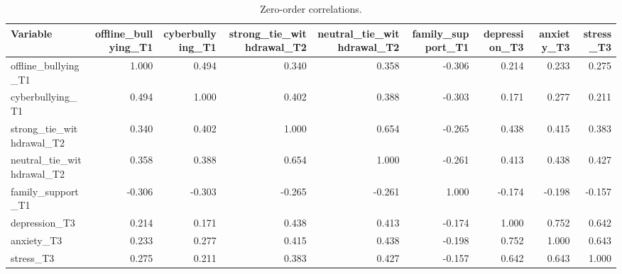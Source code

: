 \begin{table}
\caption{Zero-order correlations.}
\label{tab:corr}
\begin{tabular}{lrrrrrrrr}
\toprule
Variable & offline_bullying_T1 & cyberbullying_T1 & strong_tie_withdrawal_T2 & neutral_tie_withdrawal_T2 & family_support_T1 & depression_T3 & anxiety_T3 & stress_T3 \\
\midrule
offline_bullying_T1 & 1.000 & 0.494 & 0.340 & 0.358 & -0.306 & 0.214 & 0.233 & 0.275 \\
cyberbullying_T1 & 0.494 & 1.000 & 0.402 & 0.388 & -0.303 & 0.171 & 0.277 & 0.211 \\
strong_tie_withdrawal_T2 & 0.340 & 0.402 & 1.000 & 0.654 & -0.265 & 0.438 & 0.415 & 0.383 \\
neutral_tie_withdrawal_T2 & 0.358 & 0.388 & 0.654 & 1.000 & -0.261 & 0.413 & 0.438 & 0.427 \\
family_support_T1 & -0.306 & -0.303 & -0.265 & -0.261 & 1.000 & -0.174 & -0.198 & -0.157 \\
depression_T3 & 0.214 & 0.171 & 0.438 & 0.413 & -0.174 & 1.000 & 0.752 & 0.642 \\
anxiety_T3 & 0.233 & 0.277 & 0.415 & 0.438 & -0.198 & 0.752 & 1.000 & 0.643 \\
stress_T3 & 0.275 & 0.211 & 0.383 & 0.427 & -0.157 & 0.642 & 0.643 & 1.000 \\
\bottomrule
\end{tabular}
\end{table}
